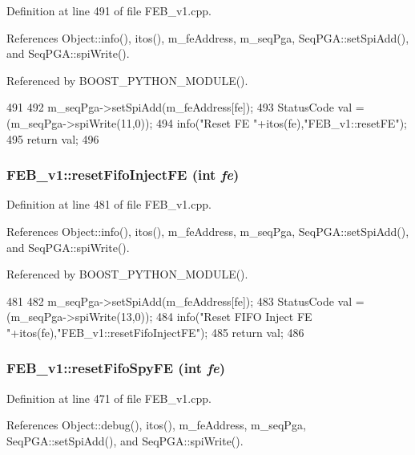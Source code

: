 Definition at line 491 of file FEB\_\-v1.cpp.

References Object::info(), itos(), m\_\-feAddress, m\_\-seqPga, SeqPGA::setSpiAdd(), and SeqPGA::spiWrite().

Referenced by BOOST\_\-PYTHON\_\-MODULE().


\begin{DoxyCode}
491                                 {  
492   m_seqPga->setSpiAdd(m_feAddress[fe]);
493   StatusCode val = (m_seqPga->spiWrite(11,0));
494   info("Reset FE "+itos(fe),"FEB_v1::resetFE");
495   return val;
496 }
\end{DoxyCode}
\hypertarget{classFEB__v1_a71d10a772bda2506fd7adb86739fb24d}{
\subsubsection[{resetFifoInjectFE}]{ FEB\_\-v1::resetFifoInjectFE (int {\em fe})}}
\label{classFEB__v1_a71d10a772bda2506fd7adb86739fb24d}


Definition at line 481 of file FEB\_\-v1.cpp.

References Object::info(), itos(), m\_\-feAddress, m\_\-seqPga, SeqPGA::setSpiAdd(), and SeqPGA::spiWrite().

Referenced by BOOST\_\-PYTHON\_\-MODULE().


\begin{DoxyCode}
481                                           {  
482   m_seqPga->setSpiAdd(m_feAddress[fe]);
483   StatusCode val = (m_seqPga->spiWrite(13,0));
484   info("Reset FIFO Inject FE "+itos(fe),"FEB_v1::resetFifoInjectFE");
485   return val;
486 }
\end{DoxyCode}
\hypertarget{classFEB__v1_ab02c292e29e01079bb9b268acbc782b1}{
\subsubsection[{resetFifoSpyFE}]{ FEB\_\-v1::resetFifoSpyFE (int {\em fe})}}
\label{classFEB__v1_ab02c292e29e01079bb9b268acbc782b1}


Definition at line 471 of file FEB\_\-v1.cpp.

References Object::debug(), itos(), m\_\-feAddress, m\_\-seqPga, SeqPGA::setSpiAdd(), and SeqPGA::spiWrite().

